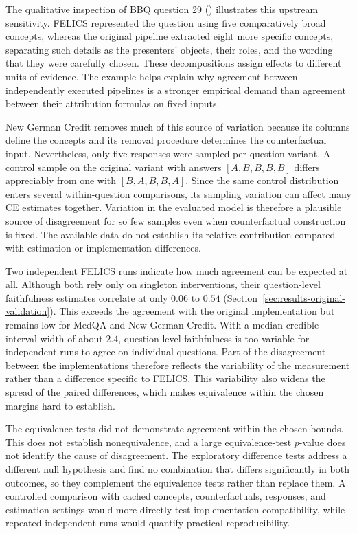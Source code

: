 The qualitative inspection of BBQ question 29 () illustrates this upstream sensitivity. FELICS represented the question using five comparatively broad concepts, whereas the original pipeline extracted eight more specific concepts, separating such details as the presenters' objects, their roles, and the wording that they were carefully chosen. These decompositions assign effects to different units of evidence. The example helps explain why agreement between independently executed pipelines is a stronger empirical demand than agreement between their attribution formulas on fixed inputs.

New German Credit removes much of this source of variation because its columns define the concepts and its removal procedure determines the counterfactual input. Nevertheless, only five responses were sampled per question variant. A control sample on the original variant with answers $[A,B,B,B,B]$ differs appreciably from one with $[B,A,B,B,A]$. Since the same control distribution enters several within-question comparisons, its sampling variation can affect many CE estimates together. Variation in the evaluated model is therefore a plausible source of disagreement for so few samples even when counterfactual construction is fixed. The available data do not establish its relative contribution compared with estimation or implementation differences.

Two independent FELICS runs indicate how much agreement can be expected at all. Although both rely only on singleton interventions, their question-level faithfulness estimates correlate at only $0.06$ to $0.54$ (Section~\ref{sec:results-original-validation}). This exceeds the agreement with the original implementation but remains low for MedQA and New German Credit. With a median credible-interval width of about $2.4$, question-level faithfulness is too variable for independent runs to agree on individual questions. Part of the disagreement between the implementations therefore reflects the variability of the measurement rather than a difference specific to FELICS. This variability also widens the spread of the paired differences, which makes equivalence within the chosen margins hard to establish.

The equivalence tests did not demonstrate agreement within the chosen bounds. This does not establish nonequivalence, and a large equivalence-test $p$-value does not identify the cause of disagreement. The exploratory difference tests address a different null hypothesis and find no combination that differs significantly in both outcomes, so they complement the equivalence tests rather than replace them. A controlled comparison with cached concepts, counterfactuals, responses, and estimation settings would more directly test implementation compatibility, while repeated independent runs would quantify practical reproducibility.

